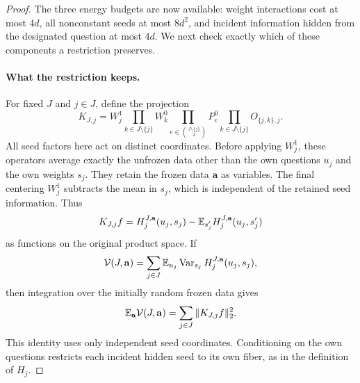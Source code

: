 \begin{proof}
The three energy budgets are now available: weight interactions cost
at most \(4d\), all nonconstant seeds at most \(8d^2\), and incident
information hidden from the designated question at most \(4d\).
We next check exactly which of these components a restriction preserves.

\paragraph{What the restriction keeps.}
For fixed \(J\) and \(j\in J\), define the projection
\begin{equation}\label{res:restriction-operator}
 K_{J,j}=
 W_j^1\prod_{k\in J\setminus\{j\}}W_k^0
 \prod_{e\in\binom{J\setminus\{j\}}2}P_e^0
 \prod_{k\in J\setminus\{j\}}O_{\{j,k\},j}.
\end{equation}
All seed factors here act on distinct coordinates.  Before applying
\(W_j^1\), these operators average exactly the unfrozen data other than
the own questions \(u_j\) and the own weights \(s_j\).  They retain
the frozen data \(\mathbf a\) as variables.  The final centering
\(W_j^1\) subtracts the mean in \(s_j\), which is independent of
the retained seed information.  Thus
\[
 K_{J,j}f
  =H_j^{J,\mathbf a}(u_j,s_j)
    -\mathbb E_{s'_j}H_j^{J,\mathbf a}(u_j,s'_j)
\]
as functions on the original product space.  If
\[
 \mathcal V(J,\mathbf a)=
     \sum_{j\in J}\mathbb E_{u_j}\operatorname{Var}_{s_j}H_j^{J,\mathbf a}(u_j,s_j),
\]
then integration over the initially random frozen data gives
\begin{equation}\label{res:restriction-variance}
 \mathbb E_{\mathbf a}\mathcal V(J,\mathbf a)
     =\sum_{j\in J}\|K_{J,j}f\|_2^2.
\end{equation}
This identity uses only independent seed coordinates.  Conditioning on
the own questions restricts each incident hidden seed to its own fiber,
as in the definition of \(H_j\).


\end{proof}
